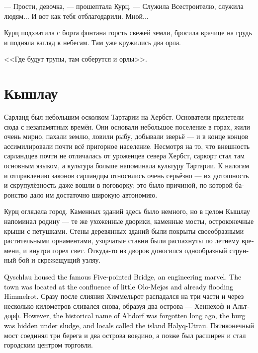 \documentclass[a4paper,12pt,fleqn]{book}\usepackage{cooltooltips}\usepackage{polyglossia}\setdefaultlanguage[babelshorthands=true]{russian}\setotherlanguage{english}\defaultfontfeatures{Ligatures=TeX,Mapping=tex-text} \usepackage{xcolor}\definecolor{lightgray}{HTML}{bbbbbb}\color{lightgray}\newcommand{\ml}[3]{\textenglish{\textcolor{black}{#3}}}
\begin{document}
--- Прости, девочка, --- прошептала Курц.
--- Служила Всестроителю, служила людям...
И вот как тебя отблагодарили.
Мной...

Курц подхватила с борта фонтана горсть свежей земли, бросила врачице на грудь и подняла взгляд к небесам.
Там уже кружились два орла.

<<Где будут трупы, там соберутся и орлы>>.

\section{Кышлау}

Сарланд был небольшим осколком Тартарии на Хербст.
Основатели прилетели сюда с незапамятных времён.
Они основали небольшое поселение в горах, жили очень мирно, пахали землю, ловили рыбу, добывали зверьё --- и в конце концов ассимилировали почти всё пригорное население.
Несмотря на то, что внешность сарландцев почти не отличалась от уроженцев севера Хербст, саркорт стал там основным языком, а культура больше напоминала культуру Тартарии.
К налогам и отправлению законов сарландцы относились очень серьёзно --- их дотошность и скрупулёзность даже вошли в поговорку;
это было причиной, по которой баронство дало им достаточно широкую автономию.

Курц оглядела город.
Каменных зданий здесь было немного, но в целом Кышлау напоминал родину --- те же ухоженные дворики, каменные мосты, остроконечные крыши с петушками.
Стены деревянных зданий были покрыты своеобразными растительными орнаментами, узорчатые ставни были распахнуты по летнему времени, и внутри горел свет.
Откуда-то из дворов доносился однообразный струнный бой и скрежещущий узляу.

\ml{$0$}
{В Кышлау находился знаменитый Пятиконечный мост --- чудо инженерного искусства.}
{Qyschlau housed the famous Five-pointed Bridge, an engineering marvel.}
\ml{$0$}
{Город находился в месте слияния маленького Оло-Мейяса и успевшего стать полноводным Химмельрота.}
{The town was located at the confluence of little Olo-Mej\o{}s and already flooding Himmelrot.}
Сразу после слияния Химмельрот распадался на три части и через несколько километров сливался снова, образуя два острова --- Хеннехоф и Альтдорф.
\ml{$0$}
{Впрочем, историческое название Альтдорфа давно забыли, городище скрылось под слоем ила, и местные называли его Хазлык-Утрау.}
{However, the historical name of Altdorf was forgotten long ago, the burg was hidden under sludge, and locals called the island Ha\dh{}lyq-Utrau.}
Пятиконечный мост соединял три берега и два острова воедино, а позже был расширен и стал городским центром торговли.
\end{document}
